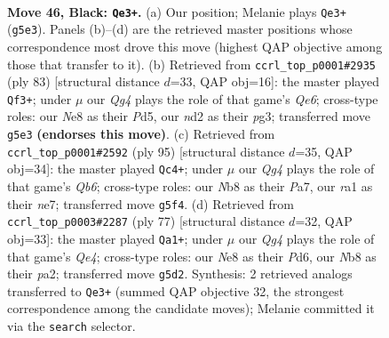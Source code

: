 \documentclass[11pt]{article}
\begin{document}
\clearpage

\begin{figure}[p]\centering
\begin{subfigure}{0.46\textwidth}\centering
\resizebox{\linewidth}{!}{%
\newchessgame
\chessboard[
  setfen={1n2nk2/7Q/7p/p4pq1/P7/7K/3N4/R7 b - - 0 46},
  showmover=false,
  pgfstyle=straightmove, color=movearrow, markmove={g5-e3}
]}
\caption{}
\end{subfigure}\hfill
\begin{subfigure}{0.46\textwidth}\centering
\resizebox{\linewidth}{!}{%
\newchessgame
\chessboard[
  setfen={6k1/6p1/N6p/3p1p2/8/4q1P1/7P/1Q3K2 b - - 7 42},
  showmover=false,
  pgfstyle=straightmove, color=movearrow, markmove={e3-f3}
]}
\caption{}
\end{subfigure}
\\[4pt]
\begin{subfigure}{0.46\textwidth}\centering
\resizebox{\linewidth}{!}{%
\newchessgame
\chessboard[
  setfen={5Q2/pp2Nppk/8/5P2/6pP/1q6/8/2K5 b - - 3 48},
  showmover=false,
  pgfstyle=straightmove, color=movearrow, markmove={b3-c4}
]}
\caption{}
\end{subfigure}\hfill
\begin{subfigure}{0.46\textwidth}\centering
\resizebox{\linewidth}{!}{%
\newchessgame
\chessboard[
  setfen={6Q1/5p1p/3p3k/p3q3/8/8/P1P3P1/7K b - - 5 39},
  showmover=false,
  pgfstyle=straightmove, color=movearrow, markmove={e5-a1}
]}
\caption{}
\end{subfigure}
\caption{\textbf{Move 46, Black: \texttt{Qe3+}.} (a) Our position; Melanie plays \texttt{Qe3+} (\texttt{g5e3}). Panels (b)--(d) are the retrieved master positions whose correspondence most drove this move (highest QAP objective among those that transfer to it). (b) Retrieved from \texttt{ccrl\_top\_p0001\#2935} (ply 83) [structural distance $d$=33, QAP obj=16]: the master played \texttt{Qf3+}; under $\mu$ our \emph{Qg4} plays the role of that game's \emph{Qe6}; cross-type roles: our \emph{N}e8 as their \emph{P}d5, our \emph{n}d2 as their \emph{p}g3; transferred move \texttt{g5e3} \textbf{(endorses this move)}. (c) Retrieved from \texttt{ccrl\_top\_p0001\#2592} (ply 95) [structural distance $d$=35, QAP obj=34]: the master played \texttt{Qc4+}; under $\mu$ our \emph{Qg4} plays the role of that game's \emph{Qb6}; cross-type roles: our \emph{N}b8 as their \emph{P}a7, our \emph{r}a1 as their \emph{n}e7; transferred move \texttt{g5f4}. (d) Retrieved from \texttt{ccrl\_top\_p0003\#2287} (ply 77) [structural distance $d$=32, QAP obj=33]: the master played \texttt{Qa1+}; under $\mu$ our \emph{Qg4} plays the role of that game's \emph{Qe4}; cross-type roles: our \emph{N}e8 as their \emph{P}d6, our \emph{N}b8 as their \emph{p}a2; transferred move \texttt{g5d2}. Synthesis: 2 retrieved analogs transferred to \texttt{Qe3+} (summed QAP objective 32, the strongest correspondence among the candidate moves); Melanie committed it via the \texttt{search} selector.}
\label{fig:thought-m91}
\end{figure}
\end{document}
